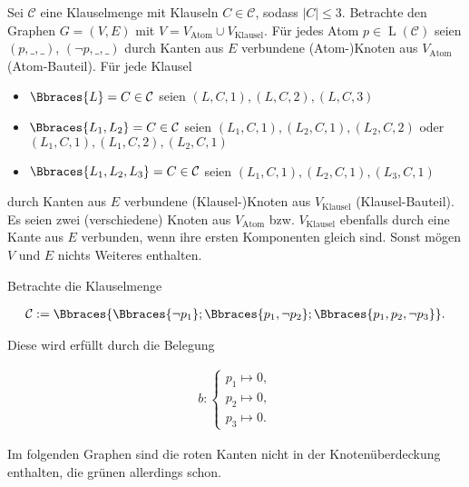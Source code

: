 
\begin{solution}

Sei $\mathcal C$ eine Klauselmenge mit Klauseln $C \in \mathcal C$, sodass $|C| \leq 3$.
Betrachte den Graphen $G = (V, E)$ mit $V = V_\text{Atom} \cup V_\text{Klausel}$.
Für jedes Atom $p \in \operatorname L(\mathcal C)$ seien $(p, \_, \_)$, $(\neg p, \_, \_)$ durch Kanten aus $E$ verbundene (Atom-)Knoten aus $V_\text{Atom}$ (Atom-Bauteil).
Für jede Klausel

\begin{itemize}
    \item $\Bbraces{L} = C \in \mathcal C$ seien $(L, C, 1), (L, C, 2), (L, C, 3)$
    \item $\Bbraces{L_1, L_2} = C \in \mathcal C$ seien $(L_1, C, 1), (L_2, C, 1), (L_2, C, 2)$ oder $(L_1, C, 1), (L_1, C, 2), (L_2, C, 1)$
    \item $\Bbraces{L_1, L_2, L_3} = C \in \mathcal C$ seien $(L_1, C, 1), (L_2, C, 1), (L_3, C, 1)$
\end{itemize}

durch Kanten aus $E$ verbundene (Klausel-)Knoten aus $V_\text{Klausel}$ (Klausel-Bauteil).
Es seien zwei (verschiedene) Knoten aus $V_\text{Atom}$ bzw. $V_\text{Klausel}$ ebenfalls durch eine Kante aus $E$ verbunden, wenn ihre ersten Komponenten gleich sind.
Sonst mögen $V$ und $E$ nichts Weiteres enthalten.

\begin{example*}

    Betrachte die Klauselmenge

    \begin{align*}
        \mathcal C
        :=
        \Bbraces{\Bbraces{\neg p_1}; \Bbraces{p_1, \neg p_2}; \Bbraces{p_1, p_2, \neg p_3}}.
    \end{align*}

    Diese wird erfüllt durch die Belegung

    \begin{align*}
        b:
        \begin{cases}
            p_1 \mapsto 0, \\
            p_2 \mapsto 0, \\
            p_3 \mapsto 0.
        \end{cases}
    \end{align*}

    Im folgenden Graphen sind die roten Kanten nicht in der Knotenüberdeckung enthalten, die grünen allerdings schon.


\end{example*}
\end{solution}
